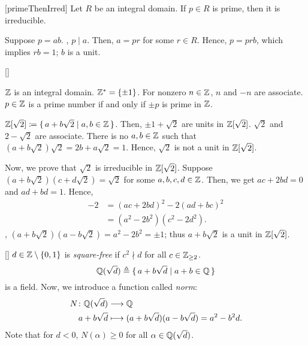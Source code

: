 \documentclass[../modern_algebra_2.tex]{subfiles}
\begin{document}
\begin{Theorem}{}[primeThenIrred]
    Let \(R\) be an integral domain.
    If \(p \in R\) is prime, then it is irreducible.
\end{Theorem}
\begin{myproof}[Proof]
    Suppose \(p = ab\).
    \WLOG, \(p \mid a\).
    Then, \(a = pr\) for some \(r \in R\).
    Hence, \(p = prb\), which implies \(rb = 1\);
    \(b\) is a unit.
\end{myproof}

\begin{Example}{}[]
    \begin{enumerate}[label=(\roman*), ref=\protect{(\roman*)}]
        \ii
        \(\ZZ\) is an integral domain. \(\ZZ^\ast = \{\pm 1\}\).
        For nonzero \(n \in \ZZ\), \(n\) and \(-n\) are associate.
        \(p \in \ZZ\) is a prime number if and only if \(\pm p\) is prime in \(\ZZ\).

        \ii
        \(\ZZ{}[\sqrt{2}] \coloneqq \{\,a + b\sqrt{2} \mid a, b \in \ZZ\,\}\).
        Then, \(\pm 1 + \sqrt{2}\) are units in \(\ZZ{}[\sqrt{2}]\).
        \(\sqrt{2}\) and \(2 - \sqrt{2}\) are associate.
        There is no \(a, b \in \ZZ\) such that \((a + b\sqrt{2})\sqrt{2} = 2b + a\sqrt{2} = 1\).
        Hence, \(\sqrt{2}\) is not a unit in \(\ZZ{}[\sqrt{2}]\).

        Now, we prove that \(\sqrt{2}\) is irreducible in \(\ZZ{}[\sqrt{2}]\).
        Suppose \((a + b\sqrt{2})(c + d\sqrt{2}) = \sqrt{2}\)
        for some \(a, b, c, d \in \ZZ\).
        Then, we get \(ac + 2bd = 0\) and \(ad + bd = 1\).
        Hence,
        \begin{align*}
            -2
            &= (ac + 2bd)^2 - 2(ad + bc)^2 \\
            &= (a^2 - 2b^2)(c^2 - 2d^2).
        \end{align*}
        \WLOG, \((a + b\sqrt{2})(a - b\sqrt{2}) = a^2 - 2b^2 = \pm 1\);
        thus \(a + b\sqrt{2}\) is a unit in \(\ZZ{}[\sqrt{2}]\).
    \end{enumerate}
\end{Example}

\begin{Definition}{}[]
    \(d \in \ZZ \setminus \{0, 1\}\) is \emph{square-free} if \(c^2 \nmid d\) for all
    \(c \in \ZZ_{\ge 2}\).
    \[
        \QQ(\sqrt{d}) \triangleq \{\,a + b\sqrt{d} \mid a + b \in \QQ\,\}
    \]
    is a field. Now, we introduce a function called \emph{norm}:
    \begin{align*}
        N \colon \QQ(\sqrt{d}) &\longrightarrow \QQ \\
        a + b\sqrt{d} &\longmapsto (a + b\sqrt{d})(a - b\sqrt{d}) = a^2 - b^2d.
    \end{align*}
    Note that for \(d < 0\), \(N(\alpha) \ge 0\) for all \(\alpha \in \QQ(\sqrt{d})\).
\end{Definition}
\end{document}
